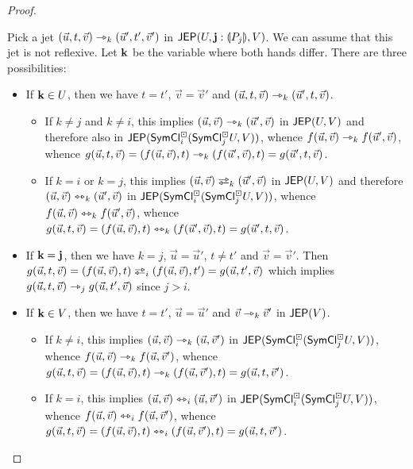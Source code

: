 \documentclass[a4paper]{memoir}
\begin{document}
\begin{proof}
\begin{itemize}
		Pick a jet $(\vec u, t, \vec v) \rightarrowtriangle_k (\vec u', t', \vec v')$ in $\mathsf{JEP}(U, \mathbf{j} : {\llparenthesis P_j \rrparenthesis}, V)$.
		We can assume that this jet is not reflexive.
		Let $\mathbf{k}$ be the variable where both hands differ.
		There are three possibilities:
		\begin{itemize}
			\item If $\mathbf{k} \in U$, then we have $t = t'$, $\vec v = \vec v'$ and $(\vec u, t, \vec v) \rightarrowtriangle_k (\vec u', t, \vec v)$.
			\begin{itemize}
				\item If $k \neq j$ and $k \neq i$, this implies $(\vec u, \vec v) \rightarrowtriangle_k (\vec u', \vec v)$ in $\mathsf{JEP}(U, V)$ and therefore also in $\mathsf{JEP}(\mathsf{SymCl}^\boxdot_i(\mathsf{SymCl}^\boxdot_j U, V))$, whence $f(\vec u, \vec v) \rightarrowtriangle_k f(\vec u', \vec v)$, whence $g(\vec u, t, \vec v) = (f(\vec u, \vec v), t) \rightarrowtriangle_k (f(\vec u', \vec v), t) = g(\vec u', t, \vec v)$.
				\item If $k = i$ or $k = j$, this implies $(\vec u, \vec v) \infrajet_k (\vec u', \vec v)$ in $\mathsf{JEP}(U, V)$ and therefore $(\vec u, \vec v) \leftrightarrowtriangle_k (\vec u', \vec v)$ in $\mathsf{JEP}(\mathsf{SymCl}^\boxdot_i(\mathsf{SymCl}^\boxdot_j U, V))$, whence $f(\vec u, \vec v) \leftrightarrowtriangle_k f(\vec u', \vec v)$, whence $g(\vec u, t, \vec v) = (f(\vec u, \vec v), t) \leftrightarrowtriangle_k (f(\vec u', \vec v), t) = g(\vec u', t, \vec v)$.
			\end{itemize}
			\item If $\mathbf{k} = \mathbf{j}$, then we have $k = j$, $\vec u = \vec u'$, $t \neq t'$ and $\vec v = \vec v'$. Then $g(\vec u, t, \vec v) = (f(\vec u, \vec v), t) \infrajet_i (f(\vec u, \vec v), t') = g(\vec u, t', \vec v)$ which implies $g(\vec u, t, \vec v) \rightarrowtriangle_j g(\vec u, t', \vec v)$ since $j > i$.
			\item If $\mathbf{k} \in V$, then we have $t = t'$, $\vec u = \vec u'$ and $\vec v \rightarrowtriangle_k \vec v'$ in $\mathsf{JEP}(V)$.
			\begin{itemize}
				\item If $k \neq i$, this implies $(\vec u, \vec v) \rightarrowtriangle_k (\vec u, \vec v')$ in $\mathsf{JEP}(\mathsf{SymCl}^\boxdot_i(\mathsf{SymCl}^\boxdot_j U, V))$, whence $f(\vec u, \vec v) \rightarrowtriangle_k f(\vec u, \vec v')$, whence $g(\vec u, t, \vec v) = (f(\vec u, \vec v), t) \rightarrowtriangle_k (f(\vec u, \vec v'), t) = g(\vec u, t, \vec v')$.
				\item If $k = i$, this implies $(\vec u, \vec v) \leftrightarrowtriangle_i (\vec u, \vec v')$ in $\mathsf{JEP}(\mathsf{SymCl}^\boxdot_i(\mathsf{SymCl}^\boxdot_j U, V))$, whence $f(\vec u, \vec v) \leftrightarrowtriangle_i f(\vec u, \vec v')$, whence $g(\vec u, t, \vec v) = (f(\vec u, \vec v), t) \leftrightarrowtriangle_i (f(\vec u, \vec v'), t) = g(\vec u, t, \vec v')$.
			\end{itemize}
		\end{itemize}
		

\end{itemize}
\end{proof}
\end{document}

